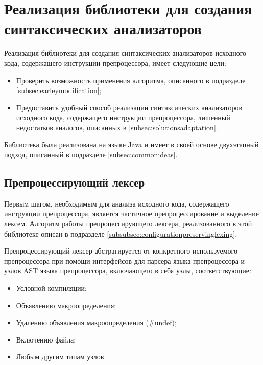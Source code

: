 \clearpage

\section{Реализация библиотеки для создания синтаксических анализаторов}
\label{sec:parserlibimpl}

Реализация библиотеки для создания синтаксических анализаторов исходного кода, содержащего инструкции препроцессора, имеет следующие цели:

\begin{itemize}
\item Проверить возможность применения алгоритма, описанного в подразделе \ref{subsec:earleymodification};
\item Предоставить удобный способ реализации синтаксических анализаторов исходного кода, содержащего инструкции препроцессора, лишенный недостатков аналогов, описанных в \ref{subsec:solutionsadaptation}.
\end{itemize}

Библиотека была реализована на языке Java и имеет в своей основе двухэтапный подход, описанный в подразделе \ref{subsec:commonideas}. 

\subsection{Препроцессирующий лексер}
\label{subsec:preprocessinglexer}

Первым шагом, необходимым для анализа исходного кода, содержащего инструкции препроцессора, является частичное препроцессирование и выделение лексем. Алгоритм работы препроцессирующего лексера, реализованного в этой библиотеке описан в подразделе \ref{subsubsec:configurationpreservinglexing}.

Препроцессирующий лексер абстрагируется от конкретного используемого препроцессора при помощи интерфейсов для парсера языка препроцессора и узлов AST языка препроцессора, включающего в себя узлы, соответствующие:

\begin{itemize}
\item Условной компиляции;
\item Объявлению макроопределения;
\item Удалению объявления макроопределения (\#undef);
\item Включению файла;
\item Любым другим типам узлов.
\end{itemize}

